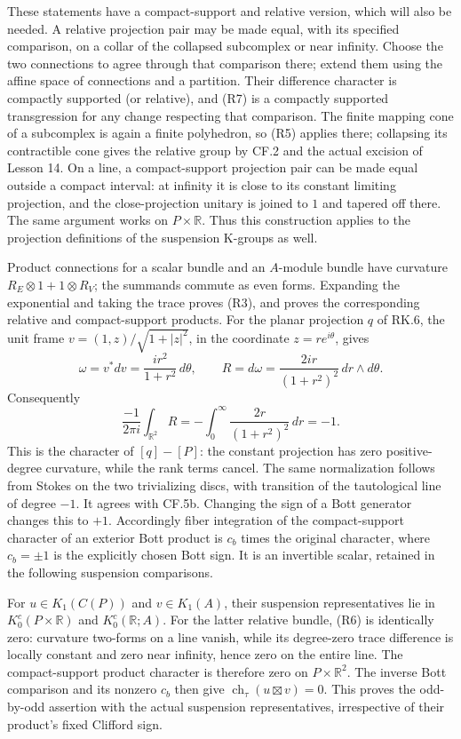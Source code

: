 \documentclass[
  11pt,
]{article}
\begin{document}
These statements have a compact-support and relative version, which will
also be needed. A relative projection pair may be made equal, with its
specified comparison, on a collar of the collapsed subcomplex or near
infinity. Choose the two connections to agree through that comparison
there; extend them using the affine space of connections and a
partition. Their difference character is compactly supported (or
relative), and (R7) is a compactly supported transgression for any
change respecting that comparison. The finite mapping cone of a
subcomplex is again a finite polyhedron, so (R5) applies there;
collapsing its contractible cone gives the relative group by CF.2 and
the actual excision of Lesson 14. On a line, a compact-support
projection pair can be made equal outside a compact interval: at
infinity it is close to its constant limiting projection, and the
close-projection unitary is joined to \(1\) and tapered off there. The
same argument works on \(P\times\mathbb R\). Thus this construction
applies to the projection definitions of the suspension K-groups as
well.

Product connections for a scalar bundle and an \(A\)-module bundle have
curvature \(R_E\otimes1+1\otimes R_V\); the summands commute as even
forms. Expanding the exponential and taking the trace proves (R3), and
proves the corresponding relative and compact-support products. For the
planar projection \(q\) of RK.6, the unit frame
\(v=(1,z)/\sqrt{1+|z|^2}\), in the coordinate \(z=re^{i\theta}\), gives
\[
 \omega=v^*dv=\frac{i r^2}{1+r^2}\,d\theta,\qquad
 R=d\omega=\frac{2i r}{(1+r^2)^2}\,dr\wedge d\theta.
\] Consequently \[
 \frac{-1}{2\pi i}\int_{\mathbb R^2}R
   =-\int_0^\infty\frac{2r}{(1+r^2)^2}\,dr=-1.
\] This is the character of \([q]-[P]\): the constant projection has
zero positive-degree curvature, while the rank terms cancel. The same
normalization follows from Stokes on the two trivializing discs, with
transition of the tautological line of degree \(-1\). It agrees with
CF.5b. Changing the sign of a Bott generator changes this to \(+1\).
Accordingly fiber integration of the compact-support character of an
exterior Bott product is \(c_b\) times the original character, where
\(c_b=\pm1\) is the explicitly chosen Bott sign. It is an invertible
scalar, retained in the following suspension comparisons.

For \(u\in K_1(C(P))\) and \(v\in K_1(A)\), their suspension
representatives lie in \(K_0^c(P\times\mathbb R)\) and
\(K_0^c(\mathbb R;A)\). For the latter relative bundle, (R6) is
identically zero: curvature two-forms on a line vanish, while its
degree-zero trace difference is locally constant and zero near infinity,
hence zero on the entire line. The compact-support product character is
therefore zero on \(P\times\mathbb R^2\). The inverse Bott comparison
and its nonzero \(c_b\) then give
\(\operatorname{ch}_\tau(u\boxtimes v)=0\). This proves the odd-by-odd
assertion with the actual suspension representatives, irrespective of
their product's fixed Clifford sign.
\end{document}
